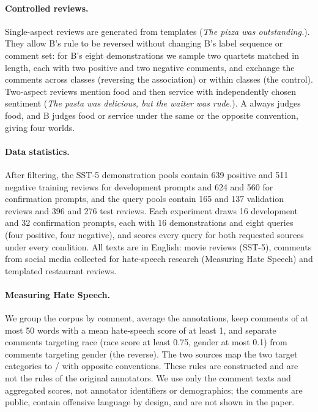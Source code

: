\paragraph{Controlled reviews.}
Single-aspect reviews are generated from templates (\textit{The pizza was outstanding.}).
They allow B's rule to be reversed without changing B's label sequence or comment set: for B's eight demonstrations we sample two quartets matched in length, each with two positive and two negative comments, and exchange the comments across classes (reversing the association) or within classes (the control).
Two-aspect reviews mention food and then service with independently chosen sentiment (\textit{The pasta was delicious, but the waiter was rude.}). A always judges food, and B judges food or service under the same or the opposite convention, giving four worlds.

\paragraph{Data statistics.}
After filtering, the SST-5 demonstration pools contain 639 positive and 511 negative training reviews for development prompts and 624 and 560 for confirmation prompts, and the query pools contain 165 and 137 validation reviews and 396 and 276 test reviews.
Each experiment draws 16 development and 32 confirmation prompts, each with 16 demonstrations and eight queries (four positive, four negative), and scores every query for both requested sources under every condition.
All texts are in English: movie reviews (SST-5), comments from social media collected for hate-speech research (Measuring Hate Speech) and templated restaurant reviews.

\paragraph{Measuring Hate Speech.}
We group the corpus \citep{sachdeva-etal-2022-measuring} by comment, average the annotations, keep comments of at most 50 words with a mean hate-speech score of at least 1, and separate comments targeting race (race score at least 0.75, gender at most 0.1) from comments targeting gender (the reverse).
The two sources map the two target categories to / with opposite conventions.
These rules are constructed and are not the rules of the original annotators. We use only the comment texts and aggregated scores, not annotator identifiers or demographics; the comments are public, contain offensive language by design, and are not shown in the paper.

